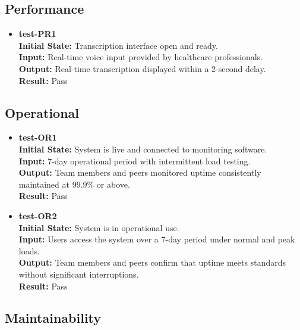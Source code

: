 \documentclass[12pt, titlepage]{article}
\begin{document}
\subsection{Performance} \label{section:4.3}

\begin{itemize}
\item \textbf{test-PR1} \label{test-PR1} \\
\textbf{Initial State:} Transcription interface open and ready. \\
\textbf{Input:} Real-time voice input provided by healthcare professionals. \\
\textbf{Output:} Real-time transcription displayed within a 2-second delay. \\
\textbf{Result:} Pass \\
\end{itemize}

\subsection{Operational} \label{section:4.4}

\begin{itemize}
\item \textbf{test-OR1} \label{test-OR1} \\
\textbf{Initial State:} System is live and connected to monitoring software. \\
\textbf{Input:} 7-day operational period with intermittent load testing. \\
\textbf{Output:} Team members and peers monitored uptime consistently maintained at 99.9\% or above. \\
\textbf{Result:} Pass \\

\item \textbf{test-OR2} \label{test-OR2} \\
\textbf{Initial State:} System is in operational use. \\
\textbf{Input:} Users access the system over a 7-day period under normal and peak loads. \\
\textbf{Output:} Team members and peers confirm that uptime meets standards without significant interruptions. \\
\textbf{Result:} Pass \\
\end{itemize}

\subsection{Maintainability} \label{section:4.5}
\end{document}
